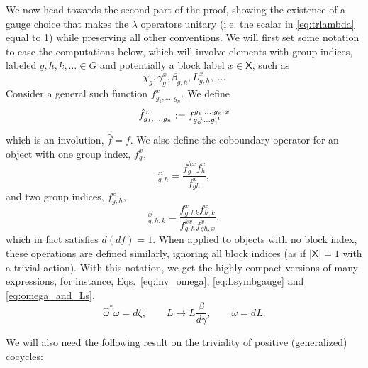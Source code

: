 \documentclass[reprint,
superscriptaddress,
amsmath,amssymb,
notitlepage,
aps,
prb,
10pt, 
tightenlines
]{revtex4-2}
\begin{document}
We now head towards the second part of the proof, showing the existence of a gauge choice that makes the $\lambda$ operators unitary (i.e. the scalar in \eqref{eq:trlambda} equal to 1) while preserving all other conventions. We will first set some notation to ease the computations below, which will involve elements with group indices, labeled $g, h, k, \ldots\in G$ and potentially a block label $x\in\mathsf{X}$, such as
\begin{equation}
    \chi_g, \gamma_g^x, \beta_{g,h}, L^x_{g,h},\ldots .
\end{equation}
Consider a general such function $f_{g_1,\ldots,g_n}^x$. We define
\begin{equation}
    \hat f^x_{g_1,\ldots,g_n} := f^{g_1\cdot\ldots\cdot g_n\cdot x}_{g_n^{\text{-}1}\ldots g_1^{\text{-}1}}
\end{equation}
which is an involution, $\hat{\hat f}=f$. We also define the coboundary operator for an object with one group index, $f^x_g$,
\begin{equation}
    [df]^x_{g,h}=\dfrac{f^{hx}_gf^x_h}{f^x_{gh}},
\end{equation}
and two group indices, $f^x_{g,h}$,
\begin{equation}
    [df]^x_{g,h,k}=\dfrac{f^{x}_{g, hk}f^{x}_{h,k}}{f^{kx}_{g,h}f^{x}_{gh,x}},
\end{equation}
which in fact satisfies $d(df)=1$. When applied to objects with no block index, these operations are defined similarly, ignoring all block indices (as if $|\mathsf{X}|=1$ with a trivial action). With this notation, we get the highly compact versions of many expressions, for instance, Eqs.~\eqref{eq:inv_omega}, \eqref{eq:Lsymbgauge} and \eqref{eq:omega_and_Ls},
\begin{equation}
    \hat\omega^*\omega = d\zeta,\qquad
    L \rightarrow L \dfrac{\beta}{d\gamma},\qquad
    \omega=dL.
\end{equation}

We will also need the following result on the triviality of positive (generalized) cocycles:
\end{document}
